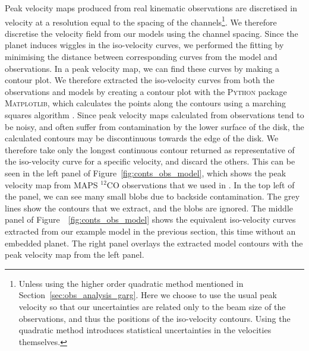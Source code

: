 Peak velocity maps produced from real kinematic observations are discretised in velocity at a resolution equal to the spacing of the channels\footnote{Unless using the higher order quadratic method mentioned in Section~\ref{sec:obs_analysis_garg}. Here we choose to use the usual peak velocity so that our uncertainties are related only to the beam size of the observations, and thus the positions of the iso-velocity contours. Using the quadratic method introduces statistical uncertainties in the velocities themselves.}.
We therefore discretise the velocity field from our models using the channel spacing.
Since the planet induces wiggles in the iso-velocity curves, we performed the fitting by minimising the distance between corresponding curves from the model and observations.
In a peak velocity map, we can find these curves by making a contour plot.
We therefore extracted the iso-velocity curves from both the observations and models by creating a contour plot with the \textsc{Python} package \textsc{Matplotlib}, which calculates the points along the contours using a marching squares algorithm \citep{hunter2007}.
Since peak velocity maps calculated from observations tend to be noisy, and often suffer from contamination by the lower surface of the disk, the calculated contours may be discontinuous towards the edge of the disk.
We therefore take only the longest continuous contour returned as representative of the iso-velocity curve for a specific velocity, and discard the others.
This can be seen in the left panel of Figure~\ref{fig:conts_obs_model}, which shows the peak velocity map from MAPS $^{12}$CO observations \citep{oberg2021} that we used in \citet{calcino2022}.
In the top left of the panel, we can see many small blobs due to backside contamination.
The grey lines show the contours that we extract, and the blobs are ignored.
The middle panel of Figure~~\ref{fig:conts_obs_model} shows the equivalent iso-velocity curves extracted from our example model in the previous section, this time without an embedded planet.
The right panel overlays the extracted model contours with the peak velocity map from the left panel.

